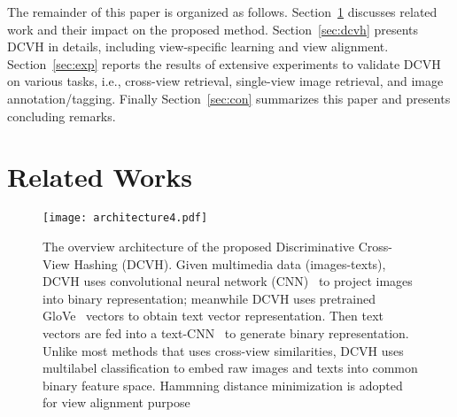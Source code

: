 \documentclass[10pt,twocolumn,letterpaper]{article}
\begin{document}
The remainder of this paper is organized as follows. Section~\ref{sec:related} discusses related work and their impact on the proposed method. Section~\ref{sec:dcvh} presents DCVH in details, including view-specific learning and view alignment. Section~\ref{sec:exp} reports the results of extensive experiments to validate DCVH on various tasks, i.e., cross-view retrieval, single-view image retrieval, and image annotation/tagging. Finally Section~\ref{sec:con} summarizes this paper and presents concluding remarks.



\section{Related Works}\label{sec:related}
\begin{figure*}
	\centering
    		  \texttt{[image: architecture4.pdf]}
  	\caption{The overview architecture of the proposed Discriminative Cross-View Hashing (DCVH). Given multimedia data (images-texts), DCVH uses convolutional neural network (CNN)~\cite{He_2016_CVPR} to project images into binary representation; meanwhile DCVH uses pretrained GloVe~\cite{pennington2014glove} vectors to obtain text vector representation. Then text vectors are fed into a text-CNN~\cite{text_cnn} to generate binary representation. Unlike most methods that uses cross-view similarities, DCVH uses multilabel classification to embed raw images and texts into common binary feature space. Hammning distance minimization is adopted for view alignment purpose}
\label{fig:arch}
\vspace{-2mm}
\end{figure*}
\end{document}

